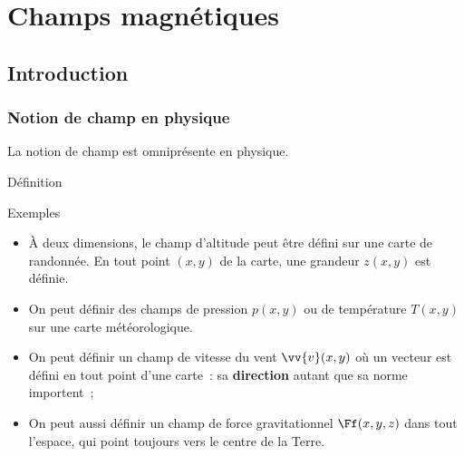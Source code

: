 \documentclass[../main/main.tex]{subfiles}
\begin{document}
\setcounter{chapter}{0}

\chapter{Champs magnétiques}
\section{Introduction}
\subsection{Notion de champ en physique}
La notion de champ est omniprésente en physique.
\begin{tdefi}{Définition}
\end{tdefi}
\begin{rexem}{Exemples}
  \begin{itemize}[label=$\diamond$, leftmargin=10pt]
    \item À deux dimensions, le champ d'altitude peut être défini sur une carte
      de randonnée. En tout point $(x,y)$ de la carte, une grandeur $z(x,y)$ est
      définie.
    \item On peut définir des champs de pression $p (x,y)$ ou de température
      $T (x,y)$ sur une carte météorologique.
    \item On peut définir un champ de vitesse du vent $\vv{v}(x,y)$ où un vecteur
      est défini en tout point d'une carte~: sa \textbf{direction} autant que sa
      norme importent~;
    \item On peut aussi définir un champ de force gravitationnel $\Ff (x,y,z)$
      dans tout l'espace, qui point toujours vers le centre de la Terre.
  \end{itemize}
\end{rexem}
\end{document}
